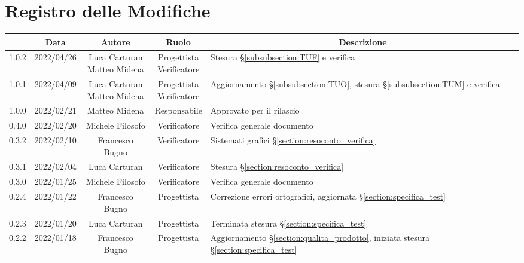 \thispagestyle{empty}
\section*{Registro delle Modifiche}

\begin{center}
	\renewcommand{\arraystretch}{1.8}
	\begin{longtable}[c]{c | c | c | c | p{5cm}}
		\rowcolor[HTML]{125E28}
		\multicolumn{1}{c}{\color[HTML]{FFFFFF} \textbf{Versione}} & 
		\multicolumn{1}{c}{\color[HTML]{FFFFFF} \textbf{Data}} & 
		\multicolumn{1}{c}{\color[HTML]{FFFFFF} \textbf{Autore}} & 
		\multicolumn{1}{c}{\color[HTML]{FFFFFF} \textbf{Ruolo}} & 
		\multicolumn{1}{c}{\color[HTML]{FFFFFF} \textbf{Descrizione}} \\
		\endhead
		1.0.2 & 2022/04/26 & \Longunderstack{Luca Carturan \\ Matteo Midena} & \Longunderstack{Progettista \\ Verificatore} & Stesura §\ref{subsubsection:TUF} e verifica\\
		1.0.1 & 2022/04/09 & \Longunderstack{Luca Carturan \\ Matteo Midena} & \Longunderstack{Progettista \\ Verificatore} & Aggiornamento §\ref{subsubsection:TUO}, stesura §\ref{subsubsection:TUM} e verifica\\
		1.0.0 & 2022/02/21 & Matteo Midena & Responsabile & Approvato per il rilascio\\
		0.4.0 & 2022/02/20 & Michele Filosofo & Verificatore & Verifica generale documento\\
		0.3.2 & 2022/02/10 & Francesco Bugno & Verificatore & Sistemati grafici §\ref{section:resoconto_verifica}\\
		0.3.1 & 2022/02/04 & Luca Carturan & Verificatore & Stesura §\ref{section:resoconto_verifica}\\
		0.3.0 & 2022/01/25 & Michele Filosofo & Verificatore & Verifica generale documento\\
		0.2.4 & 2022/01/22 & Francesco Bugno & Progettista & Correzione errori ortografici, aggiornata §\ref{section:specifica_test}\\
		0.2.3 & 2022/01/20 & Luca Carturan & Progettista & Terminata stesura §\ref{section:specifica_test}\\
		0.2.2 & 2022/01/18 & Francesco Bugno & Progettista & Aggiornamento §\ref{section:qualita_prodotto}, iniziata stesura §\ref{section:specifica_test}\\

\end{longtable}
\end{center}
